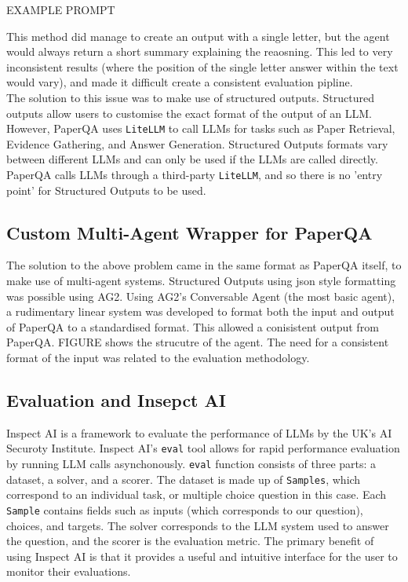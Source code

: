 EXAMPLE PROMPT

This method did manage to create an output with a single letter, but the agent would always return a short summary explaining the reaosning. 
This led to very inconsistent results (where the position of the single letter answer within the text would vary), and made it difficult create a consistent evaluation pipline. \\

The solution to this issue was to make use of structured outputs. Structured outputs allow users to customise the exact format of the output of an LLM. However, PaperQA uses \texttt{LiteLLM} to call LLMs for tasks such as Paper Retrieval, Evidence Gathering, and Answer Generation. Structured Outputs formats vary between different LLMs and can only be used if the LLMs are called directly. PaperQA calls LLMs through a third-party \texttt{LiteLLM}, and so there is no 'entry point' for Structured Outputs to be used.

\subsection{Custom Multi-Agent Wrapper for PaperQA}
The solution to the above problem came in the same format as PaperQA itself, to make use of multi-agent systems. Structured Outputs using json style formatting was possible using AG2. 
Using AG2's Conversable Agent (the most basic agent), a rudimentary linear system was developed to format both the input and output of PaperQA to a standardised format. 
This allowed a conisistent output from PaperQA. 
FIGURE shows the strucutre of the agent. 
The need for a consistent format of the input was related to the evaluation methodology. 

\subsection{Evaluation and Insepct AI}

Inspect AI is a framework to evaluate the performance of LLMs by the UK's AI Securoty Institute. Inspect AI's \texttt{eval} tool allows for rapid performance evaluation by running LLM calls asynchonously. \texttt{eval} function consists of three parts: a dataset, a solver, and a scorer. The dataset is made up of \texttt{Samples}, which correspond to an individual task, or multiple choice question in this case. Each \texttt{Sample} contains fields such as inputs (which corresponds to our question), choices, and targets. The solver corresponds to the LLM system used to answer the question, and the scorer is the evaluation metric. The primary benefit of using Inspect AI is that it provides a useful and intuitive interface for the user to monitor their evaluations.\\

